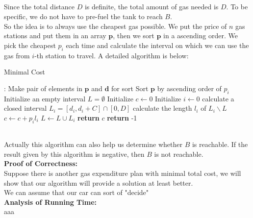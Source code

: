\documentclass[12pt,letterpaper]{article}
\begin{document}
\newpage
\subsection{}
Since the total distance $D$ is definite,
the total amount of gas needed is $D$.
To be specific, we do not have to pre-fuel the tank to reach $B$.\\
So the idea is to always use the cheapest gas possible.
We put the price of $n$ gas stations and put them in an array $\boldsymbol{p}$,
then we sort $\boldsymbol{p}$ in a ascending order. 
We pick the cheapest $p_i$ each time and calculate the interval
on which we can use the gas from $i$-th station to travel.
A detailed algorithm is below:
\begin{algorithm}
  \caption{Minimal Cost}\label{alg:mcost}
  \begin{algorithmic}[1]
  :
  \State Make pair of elements in $\boldsymbol{p}$ and $\boldsymbol{d}$ for sort
  \State Sort $\boldsymbol{p}$ by ascending order of $p_i$
  \State Initialize an empty interval $L=\emptyset$
  \State Initialize $c\gets 0$
  \State Initialize $i\gets 0$
  \State calculate a closed interval $L_i=[d_i,d_i+C]\cap[0,D]$
  \State calculate the length $l_i$ of $L_i\backslash L$
  \State $c\gets c+p_il_i$
  \State $L\gets L\cup L_i$
  \State \textbf{return} $c$
  \EndIf
  \EndWhile
  \State \textbf{return} -1
  \EndProcedure
  \end{algorithmic}
\end{algorithm}\\
Actually this algorithm can also help us determine whether $B$ is reachable.
If the result given by this algorithm is negative,
then $B$ is not reachable.\\
\textbf{Proof of Correctness:}\\
Suppose there is another gas expenditure plan with minimal total cost,
we will show that our algorithm will provide a solution at least better.\\
We can assume that our car can sort of "decide" \\

\textbf{Analysis of Running Time:}\\
aaa
\newpage
\section{}
\end{document}
